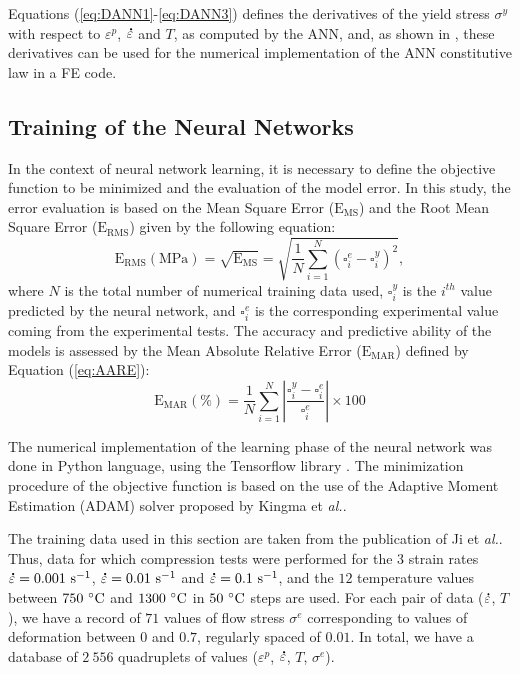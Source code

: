 \documentclass[algorithms,article,submit,pdftex,moreauthors]{Definitions/mdpi}
\makeatletter
\DeclareRobustCommand{\mdot}[1]{\accentset{\mbox{\bfseries .}}{#1}}
\DeclareRobustCommand{\eal}{et \emph{al.}\@\xspace}
\DeclareRobustCommand{\MSE}{\text{E}_\text{MS}}
\DeclareRobustCommand{\RMSE}{\text{E}_\text{RMS}}
\DeclareRobustCommand{\MARE}{\text{E}_\text{MAR}}
\DeclareRobustCommand{\ps}{\text{s}^{-1}}
\DeclareRobustCommand{\MPa}{\text{MPa}}
\makeatother
\begin{document}
Equations (\ref{eq:DANN1}-\ref{eq:DANN3}) defines the derivatives of the yield stress $\sigma^y$ with respect to $\varepsilon^p$, $\mdot\varepsilon$ and $T$, as computed by the ANN, and, as shown in \cite{Pantale-2021}, these derivatives can be used for the numerical implementation of the ANN constitutive law in a FE code.

\subsection{Training of the Neural Networks}\label{sec:ANN-traning}

In the context of neural network learning, it is necessary to define the objective function to be minimized and the evaluation of the model error.
In this study, the error evaluation is based on the Mean Square Error ($\MSE$) and the Root Mean Square Error ($\RMSE$) given by the following equation:
\begin{equation}
\RMSE (\MPa) = \sqrt{\MSE} = \sqrt{\frac{1}{N} \sum_{i=1}^{N} \left(\square_i^e - \square_i^y\right)^2}, \label{eq:RMSE}
\end{equation}
where $N$ is the total number of numerical training data used, $\square_i^y$ is the $i^{th}$ value predicted by the neural network, and $\square_i^e$ is the corresponding experimental value coming from the experimental tests.
The accuracy and predictive ability of the models is assessed by the Mean Absolute Relative Error ($\MARE$) defined by Equation (\ref{eq:AARE}):
\begin{equation}
\MARE(\%) = \frac{1}{N} \sum_{i=1}^{N}{\left|\frac{\square_i^y -\square_i^e}{\square_i^e}\right|} \times 100 \label{eq:AARE}
\end{equation}

The numerical implementation of the learning phase of the neural network was done in Python language, using the Tensorflow library \cite{Abadi-2016, Mattmann-2020}.
The minimization procedure of the objective function is based on the use of the Adaptive Moment Estimation (ADAM) solver proposed by Kingma \eal \cite{Kingma-2015}.

The training data used in this section are taken from the publication of Ji \eal \cite{Ji-2018}.
Thus, data for which compression tests were performed for the $3$ strain rates $\mdot\varepsilon=0.001~\ps$, $\mdot\varepsilon=0.01~\ps$ and $\mdot\varepsilon=0.1~\ps$, and the $12$ temperature values between $750~\celsius$ and $1300~\celsius$ in $50~\celsius$ steps are used.
For each pair of data ($\mdot\varepsilon$, $T$), we have a record of $71$ values of flow stress $\sigma^e$ corresponding to values of deformation between $0$ and $0.7$, regularly spaced of $0.01$.
In total, we have a database of $2~556$ quadruplets of values ($\varepsilon^p$, $\mdot\varepsilon$, $T$, $\sigma^e$).
\end{document}

